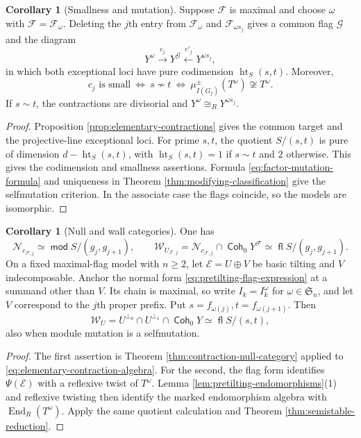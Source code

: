 \documentclass[a4paper,reqno]{amsart}
\def\E{\mathcal{E}}
\def\F{\mathcal{F}}
\def\W{\mathcal{W}}
\DeclareMathOperator{\md}{\mathsf{mod}}
\renewcommand{\mod}{\md}
\DeclareMathOperator{\fl}{\mathsf{fl}}
\DeclareMathOperator{\Coh}{\mathsf{Coh}}
\DeclareMathOperator{\End}{End}
\DeclareMathOperator{\height}{ht}
\theoremstyle{definition}
\newtheorem{Cor}[Thm]{Corollary}
\begin{document}
\begin{Cor}[Smallness and mutation]\label{cor:small-contractions-mutation}
Suppose $\F$ is maximal and choose $\omega$ with $\F=\F_\omega$. Deleting the $j$th entry from $\F_\omega$ and $\F_{\omega s_j}$ gives a common flag $\mathcal G$ and the diagram
\begin{equation}\label{eq:elementary-contraction-diagram}
Y^\omega\xrightarrow{\,c_j\,}Y^{\mathcal G}
\xleftarrow{\,c'_j\,}Y^{\omega s_j},
\end{equation}
in which both exceptional loci have pure codimension $\height_S(s,t)$. Moreover,
\begin{equation}\label{eq:small-mutation-criterion}
c_j\text{ is small}
\ \Longleftrightarrow\ s\not\sim t
\ \Longleftrightarrow\ \mu_{I(G_j)}^\pm(T^\omega)\not\cong T^\omega.
\end{equation}
If $s\sim t$, the contractions are divisorial and $Y^\omega\cong_RY^{\omega s_j}$.
\end{Cor}
\begin{proof}
Proposition \ref{prop:elementary-contractions} gives the common target and the projective-line exceptional loci. For prime $s,t$, the quotient $S/(s,t)$ is pure of dimension $d-\height_S(s,t)$, with $\height_S(s,t)=1$ if $s\sim t$ and $2$ otherwise. This gives the codimension and smallness assertions. Formula \eqref{eq:factor-mutation-formula} and uniqueness in Theorem \ref{thm:modifying-classification} give the selfmutation criterion. In the associate case the flags coincide, so the models are isomorphic.
\end{proof}

\begin{Cor}[Null and wall categories]\label{cor:explicit-wall-category}
One has
\[
\mathcal N_{c_{\F,j}}\simeq\mod S/(g_j,g_{j+1}),\qquad
\W_{U_{\F,j}}=\mathcal N_{c_{\F,j}}\cap\Coh_0Y^\F
\simeq\fl S/(g_j,g_{j+1}).
\]
On a fixed maximal-flag model with $n\ge2$, let $\E=U\oplus V$ be basic tilting and $V$ indecomposable. Anchor the normal form \eqref{eq:pretilting-flag-expression} at a summand other than $V$. Its chain is maximal, so write $I_k=I_k^\omega$ for $\omega\in\mathfrak S_n$, and let $V$ correspond to the $j$th proper prefix. Put $s=f_{\omega(j)},t=f_{\omega(j+1)}$. Then
\begin{equation}\label{eq:explicit-wall-category}
\W_U=U^{\perp_0}\cap U^{\perp_1}\cap\Coh_0Y\simeq\fl S/(s,t),
\end{equation}
also when module mutation is a selfmutation.
\end{Cor}
\begin{proof}
The first assertion is Theorem \ref{thm:contraction-null-category} applied to \eqref{eq:elementary-contraction-algebra}. For the second, the flag form identifies $\Psi(\E)$ with a reflexive twist of $T^\omega$. Lemma \ref{lem:pretilting-endomorphisms}(1) and reflexive twisting then identify the marked endomorphism algebra with $\End_R(T^\omega)$. Apply the same quotient calculation and Theorem \ref{thm:semistable-reduction}.
\end{proof}
\end{document}
